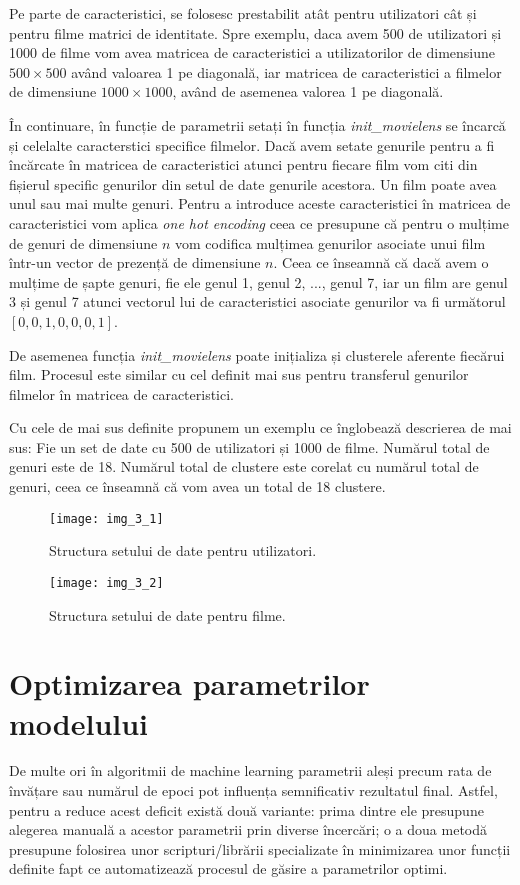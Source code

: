 Pe parte de caracteristici, se folosesc prestabilit atât pentru utilizatori cât și pentru filme matrici de identitate. Spre exemplu, daca avem 500 de utilizatori și 1000 de filme vom avea matricea de caracteristici a utilizatorilor de dimensiune $500 \times 500$ având valoarea 1 pe diagonală, iar matricea de caracteristici a filmelor de dimensiune $1000 \times 1000$, având de asemenea valorea 1 pe diagonală.

În continuare, în funcție de parametrii setați în funcția \textit{init\_movielens} se încarcă și celelalte caracterstici specifice filmelor. Dacă avem setate genurile pentru a fi încărcate în matricea de caracteristici atunci pentru fiecare film vom citi din fișierul specific genurilor din setul de date genurile acestora. Un film poate avea unul sau mai multe genuri. Pentru a introduce aceste caracteristici în matricea de caracteristici vom aplica \textit{one hot encoding} ceea ce presupune că pentru o mulțime de genuri de dimensiune $n$ vom codifica mulțimea genurilor asociate unui film într-un vector de prezență de dimensiune $n$. Ceea ce înseamnă că dacă avem o mulțime de șapte genuri, fie ele genul 1, genul 2, ..., genul 7, iar un film are genul 3 și genul 7 atunci vectorul lui de caracteristici asociate genurilor va fi următorul $[0, 0, 1, 0, 0, 0, 1]$.

De asemenea funcția \textit{init\_movielens} poate inițializa și clusterele aferente fiecărui film. Procesul este similar cu cel definit mai sus pentru transferul genurilor filmelor în matricea de caracteristici.

Cu cele de mai sus definite propunem un exemplu ce înglobează descrierea de mai sus:
Fie un set de date cu 500 de utilizatori și 1000 de filme. Numărul total de genuri este de 18. Numărul total de clustere este corelat cu numărul total de genuri, ceea ce înseamnă că vom avea un total de 18 clustere.
\begin{figure}[!h]
	\centering
	\texttt{[image: img\_3\_1]}
	\caption[Structura setului de date pentru utilizatori]{Structura setului de date pentru utilizatori.}
\end{figure} 

\begin{figure}[!h]
	\centering
	\texttt{[image: img\_3\_2]}
	\caption[Structura setului de date pentru filme]{Structura setului de date pentru filme.}
\end{figure} 

\section{Optimizarea parametrilor modelului}
De multe ori în algoritmii de machine learning parametrii aleși precum rata de învățare sau numărul de epoci pot influența semnificativ rezultatul final. Astfel, pentru a reduce acest deficit există două variante: prima dintre ele presupune alegerea manuală a acestor parametrii prin diverse încercări; o a doua metodă presupune folosirea unor scripturi/librării specializate în minimizarea unor funcții definite fapt ce automatizează procesul de găsire a parametrilor optimi.

